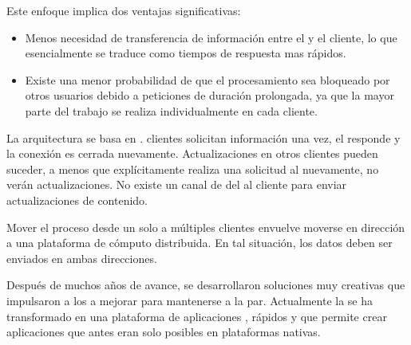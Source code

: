 Este enfoque \clientcentric implica dos ventajas significativas:
\begin{itemize}
	\item Menos necesidad de transferencia de información entre el \serverAS y el cliente, lo que esencialmente se traduce como tiempos de respuesta mas rápidos.
	\item Existe una menor probabilidad de que el procesamiento sea bloqueado por otros usuarios debido a peticiones de duración prolongada, ya que la mayor parte del trabajo se realiza individualmente en cada cliente.
\end{itemize}

La arquitectura \clientserver se basa en \statelessconnectionsINT. clientes solicitan información una vez, el \serverAS responde y la conexión es cerrada nuevamente. Actualizaciones en otros clientes pueden suceder, a menos que explícitamente realiza una solicitud al \serverAS nuevamente, no verán actualizaciones. No existe un canal de \feedback del \serverAS al cliente para enviar actualizaciones de contenido.

Mover el proceso desde un solo \serverAS a múltiples clientes envuelve moverse en dirección a una plataforma de cómputo distribuida. En tal situación, los datos deben ser enviados en ambas direcciones.

Después de muchos años de avance, se desarrollaron soluciones muy creativas que impulsaron a los \browsersINT a mejorar para mantenerse a la par. 
Actualmente la \webINT se ha transformado en una plataforma de aplicaciones \fullyfeatured, \runtimesCPT \javaScriptNAME rápidos y \standard \htmlfive que permite crear aplicaciones que antes eran solo posibles en plataformas nativas.

\subsection{\singlePageAppINT}

